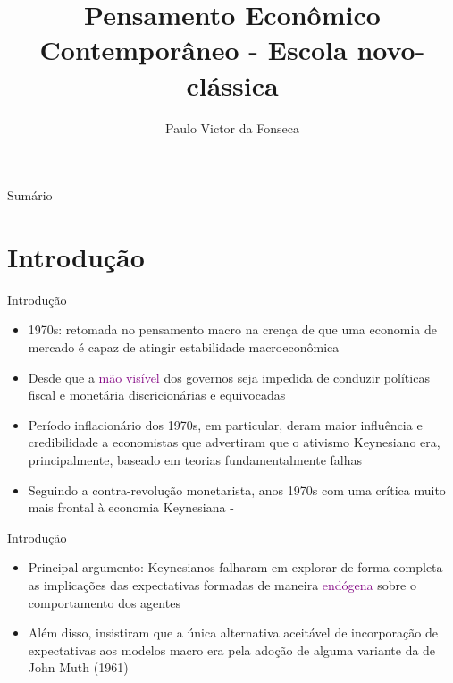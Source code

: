 \documentclass[10pt]{beamer}
\title[]{Pensamento Econômico Contemporâneo - Escola novo-clássica}
\author[]{Paulo Victor da Fonseca}
\date{}
\begin{document}
\begin{frame}[plain]
\end{frame}

\begin{frame}{Sumário}
    \tableofcontents
\end{frame}

\section{Introdução}
\begin{frame}{Introdução}
    \begin{itemize}
        \item 1970s: retomada no pensamento macro na crença de que uma economia de mercado é capaz de atingir estabilidade macroeconômica
        \bigskip
        \item Desde que a \textcolor{purple}{mão visível} dos governos seja impedida de conduzir políticas fiscal e monetária discricionárias e equivocadas
        \bigskip
        \item Período inflacionário dos 1970s, em particular, deram maior influência e credibilidade a economistas que advertiram que o ativismo Keynesiano era, principalmente, baseado em teorias fundamentalmente falhas
        \bigskip
        \item Seguindo a contra-revolução monetarista, anos 1970s com uma crítica muito mais frontal à economia Keynesiana - 
    \end{itemize}
\end{frame}

\begin{frame}{Introdução}
    \begin{itemize}
        \item Principal argumento: Keynesianos falharam em explorar de forma completa as implicações das expectativas formadas de maneira \textcolor{purple}{endógena} sobre o comportamento dos agentes
        \bigskip
        \item Além disso, insistiram que a única alternativa aceitável de incorporação de expectativas aos modelos macro era pela adoção de alguma variante da  de John Muth (1961)
    \end{itemize}
\end{frame}
\end{document}
